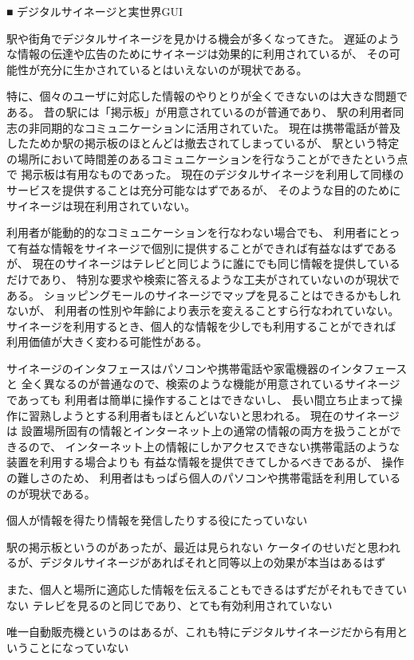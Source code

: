 ■ デジタルサイネージと実世界GUI

駅や街角でデジタルサイネージを見かける機会が多くなってきた。
遅延のような情報の伝達や広告のためにサイネージは効果的に利用されているが、
その可能性が充分に生かされているとはいえないのが現状である。

特に、個々のユーザに対応した情報のやりとりが全くできないのは大きな問題である。
昔の駅には「掲示板」が用意されているのが普通であり、
駅の利用者同志の非同期的なコミュニケーションに活用されていた。
現在は携帯電話が普及したためか駅の掲示板のほとんどは撤去されてしまっているが、
駅という特定の場所において時間差のあるコミュニケーションを行なうことができたという点で
掲示板は有用なものであった。
現在のデジタルサイネージを利用して同様のサービスを提供することは充分可能なはずであるが、
そのような目的のためにサイネージは現在利用されていない。

利用者が能動的的なコミュニケーションを行なわない場合でも、
利用者にとって有益な情報をサイネージで個別に提供することができれば有益なはずであるが、
現在のサイネージはテレビと同じように誰にでも同じ情報を提供しているだけであり、
特別な要求や検索に答えるような工夫がされていないのが現状である。
ショッピングモールのサイネージでマップを見ることはできるかもしれないが、
利用者の性別や年齢により表示を変えることすら行なわれていない。
サイネージを利用するとき、個人的な情報を少しでも利用することができれば
利用価値が大きく変わる可能性がある。

サイネージのインタフェースはパソコンや携帯電話や家電機器のインタフェースと
全く異なるのが普通なので、検索のような機能が用意されているサイネージであっても
利用者は簡単に操作することはできないし、
長い間立ち止まって操作に習熟しようとする利用者もほとんどいないと思われる。
現在のサイネージは
設置場所固有の情報とインターネット上の通常の情報の両方を扱うことができるので、
インターネット上の情報にしかアクセスできない携帯電話のような装置を利用する場合よりも
有益な情報を提供できてしかるべきであるが、
操作の難しさのため、
利用者はもっぱら個人のパソコンや携帯電話を利用しているのが現状である。


個人が情報を得たり情報を発信したりする役にたっていない

駅の掲示板というのがあったが、最近は見られない
ケータイのせいだと思われるが、デジタルサイネージがあればそれと同等以上の効果が本当はあるはず

また、個人と場所に適応した情報を伝えることもできるはずだがそれもできていない
テレビを見るのと同じであり、とても有効利用されていない

唯一自動販売機というのはあるが、これも特にデジタルサイネージだから有用ということになっていない

